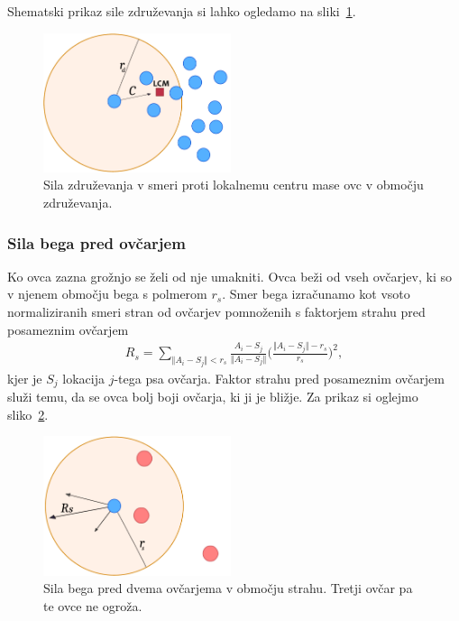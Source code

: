 Shematski prikaz sile združevanja si lahko ogledamo na sliki~\ref{fig:stroembom-zdruzi}.

\begin{figure}[ht]  %
	\centering
	\includegraphics[width=0.49\textwidth]{../poglavja/images/stroembom_zblizevanje.pdf}
	\caption[Sila združevanja]{Sila združevanja v smeri proti lokalnemu centru mase ovc v območju združevanja.} %
	\label{fig:stroembom-zdruzi}
\end{figure}

\subsubsection{Sila bega pred ovčarjem}

Ko ovca zazna grožnjo se želi od nje umakniti. Ovca beži od vseh ovčarjev, ki so v njenem območju bega s polmerom $r_s$. Smer bega izračunamo kot vsoto normaliziranih smeri stran od ovčarjev pomnoženih s faktorjem strahu pred posameznim ovčarjem
\begin{align}
R_s = \sum_{\Vert A_i - S_j\Vert < r_s}\frac{ A_i - S_j}{\Vert A_i - S_j\Vert}\Big(\frac{ \Vert A_i - S_j\Vert - r_s}{r_s}\Big)^2, \label{eq:stroembom-beg}
\end{align}
kjer je $S_j$ lokacija $j$-tega psa ovčarja. Faktor strahu pred posameznim ovčarjem služi temu, da se ovca bolj boji ovčarja, ki ji je bližje. Za prikaz si oglejmo sliko~\ref{fig:stroembom-beg}.

\begin{figure}[ht]  %
	\centering
	\includegraphics[width=0.49\textwidth]{../poglavja/images/stroembom_beg.pdf}
	\caption[Sila bega pred ovčarjem]{Sila bega pred dvema ovčarjema v območju strahu. Tretji ovčar pa te ovce ne ogroža.} %
	\label{fig:stroembom-beg}
\end{figure}

